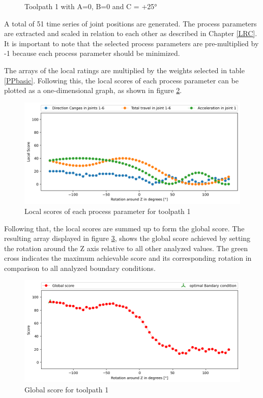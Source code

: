 \begin{figure}[H]
\begin{minipage}{0.5\textwidth}
		\caption{Toolpath 1 with A=0, B=0 and C = +25°}
		\label{TP1+25}
	\end{minipage}\par
\end{figure}

A total of 51 time series of joint positions are generated. The process parameters are extracted and scaled in relation to each other as described in Chapter \ref{LRC}. It is important to note that the selected process parameters are pre-multiplied by -1 because each process parameter should be minimized.

The arrays of the local ratings are multiplied by the weights selected in table \ref{PPbasic}.
Following this, the local scores of each process parameter can be plotted as a one-dimensional graph, as shown in figure \ref{LS1}. %

\begin{figure}[H]
	\centerline{\includegraphics[width=1\textwidth]{figures/LocalScores_1.png}}
	\caption{Local scores of each process parameter for toolpath 1}
	\label{LS1}
\end{figure}


Following that, the local scores are summed up to form the global score. The resulting array displayed in figure \ref{GS1}, shows the global score achieved by setting the rotation around the Z axis relative to all other analyzed values. The green cross indicates the maximum achievable score and its corresponding rotation in comparison to all analyzed boundary conditions.


\begin{figure}[H]
	\centerline{\includegraphics[width=1\textwidth]{figures/best_c_1.png}}
	\caption{Global score for toolpath 1}
	\label{GS1}
\end{figure}

